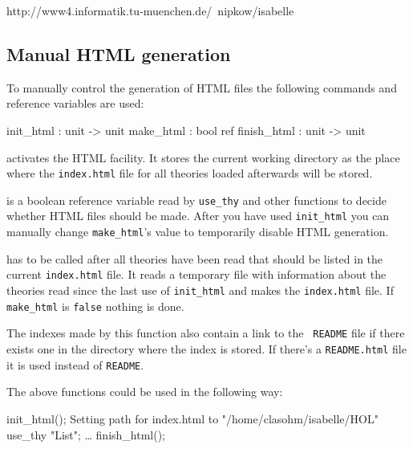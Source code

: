\begin{ttbox}
http://www4.informatik.tu-muenchen.de/~nipkow/isabelle
\end{ttbox}


\subsection*{Manual HTML generation}

To manually control the generation of HTML files the following
commands and reference variables are used:

\begin{ttbox}
init_html   : unit -> unit
make_html   : bool ref
finish_html : unit -> unit
\end{ttbox}

\begin{ttdescription}
\item[\ttindexbold{init_html}]
activates the HTML facility. It stores the current working directory
as the place where the {\tt index.html} file for all theories loaded
afterwards will be stored.

\item[\ttindexbold{make_html}]
is a boolean reference variable read by {\tt use_thy} and other
functions to decide whether HTML files should be made. After you have
used {\tt init_html} you can manually change {\tt make_html}'s value
to temporarily disable HTML generation.

\item[\ttindexbold{finish_html}]
has to be called after all theories have been read that should be
listed in the current {\tt index.html} file. It reads a temporary
file with information about the theories read since the last use of
{\tt init_html} and makes the {\tt index.html} file. If {\tt
make_html} is {\tt false} nothing is done.

The indexes made by this function also contain a link to the {\tt
README} file if there exists one in the directory where the index is
stored. If there's a {\tt README.html} file it is used instead of
{\tt README}.

\end{ttdescription}

The above functions could be used in the following way:

\begin{ttbox}
init_html();
{\out Setting path for index.html to "/home/clasohm/isabelle/HOL"}
use_thy "List";
\dots
finish_html();
\end{ttbox}

